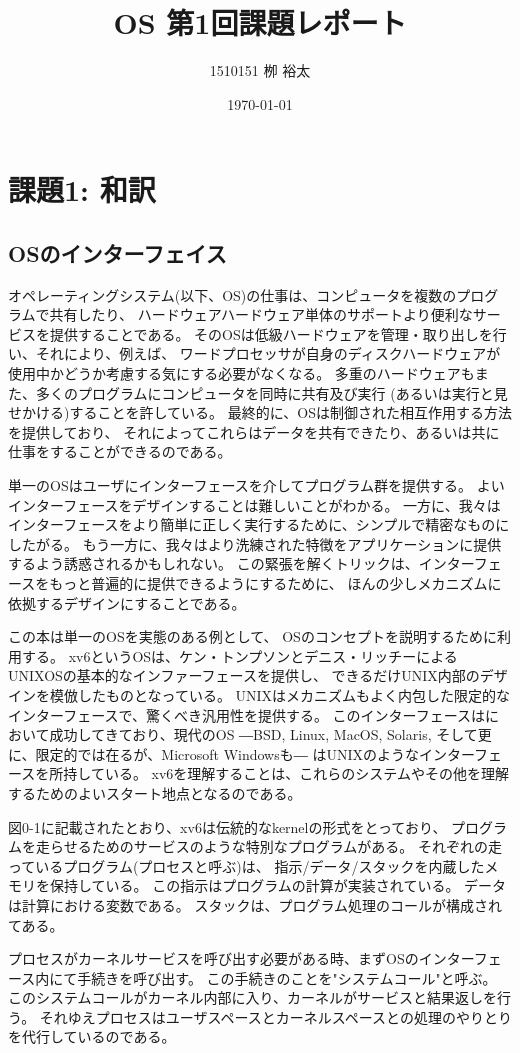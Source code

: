 \documentclass[11pt,a4paper, uplatex]{jsarticle}
\title{OS 第1回課題レポート}
\author{1510151  栁 裕太}
\date{\today}
\begin{document}
\maketitle
\section{課題1: 和訳}

\subsection{OSのインターフェイス}
オペレーティングシステム(以下、OS)の仕事は、コンピュータを複数のプログラムで共有したり、
ハードウェアハードウェア単体のサポートより便利なサービスを提供することである。
そのOSは低級ハードウェアを管理・取り出しを行い、それにより、例えば、
ワードプロセッサが自身のディスクハードウェアが使用中かどうか考慮する気にする必要がなくなる。
多重のハードウェアもまた、多くのプログラムにコンピュータを同時に共有及び実行
(あるいは実行と見せかける)することを許している。
最終的に、OSは制御された相互作用する方法を提供しており、
それによってこれらはデータを共有できたり、あるいは共に仕事をすることができるのである。

単一のOSはユーザにインターフェースを介してプログラム群を提供する。
よいインターフェースをデザインすることは難しいことがわかる。
一方に、我々はインターフェースをより簡単に正しく実行するために、シンプルで精密なものにしたがる。
もう一方に、我々はより洗練された特徴をアプリケーションに提供するよう誘惑されるかもしれない。
この緊張を解くトリックは、インターフェースをもっと普遍的に提供できるようにするために、
ほんの少しメカニズムに依拠するデザインにすることである。

この本は単一のOSを実態のある例として、
OSのコンセプトを説明するために利用する。
xv6というOSは、ケン・トンプソンとデニス・リッチーによる
UNIXOSの基本的なインファーフェースを提供し、
できるだけUNIX内部のデザインを模倣したものとなっている。
UNIXはメカニズムもよく内包した限定的なインターフェースで、驚くべき汎用性を提供する。
このインターフェースはにおいて成功してきており、現代のOS
―BSD, Linux, MacOS, Solaris, そして更に、限定的では在るが、Microsoft Windowsも―
はUNIXのようなインターフェースを所持している。
xv6を理解することは、これらのシステムやその他を理解するためのよいスタート地点となるのである。

図0-1に記載されたとおり、xv6は伝統的なkernelの形式をとっており、
プログラムを走らせるためのサービスのような特別なプログラムがある。
それぞれの走っているプログラム(プロセスと呼ぶ)は、
指示/データ/スタックを内蔵したメモリを保持している。
この指示はプログラムの計算が実装されている。
データは計算における変数である。
スタックは、プログラム処理のコールが構成されてある。

プロセスがカーネルサービスを呼び出す必要がある時、まずOSのインターフェース内にて手続きを呼び出す。
この手続きのことを"システムコール"と呼ぶ。
このシステムコールがカーネル内部に入り、カーネルがサービスと結果返しを行う。
それゆえプロセスはユーザスペースとカーネルスペースとの処理のやりとりを代行しているのである。
%
%
\end{document}
